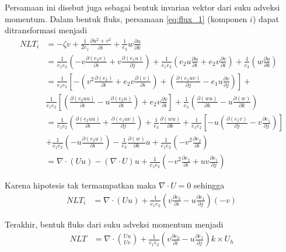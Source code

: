 \begin{spacing}{1.5}
	Persamaan ini disebut juga sebagai bentuk invarian vektor dari suku adveksi momentum. Dalam bentuk fluks, persamaan \ref{eq:flux_1} (komponen $i$) dapat ditransformasi menjadi
	\begin{equation*}
		\begin{aligned}
			NLT_i &= -\zeta v + \frac{1}{2e_1} \frac{\partial u^2+v^2}{\partial i} + \frac{1}{e_3}w\frac{\partial u}{\partial k} \\
			&= \frac{1}{e_1 e_2}\left(-v\frac{\partial (e_2 v)}{\partial i} + v\frac{\partial (e_1 u)}{\partial j}\right) + \frac{1}{e_1 e_2}\left(e_2 u\frac{\partial u}{\partial i} + e_2 v\frac{\partial v}{\partial i}\right) + \frac{1}{e_3}\left( w\frac{\partial u}{\partial k}\right)  
			\\
			&= \frac{1}{e_1 e_2} \left[-\left(v^2\frac{\partial (e_2)}{\partial i} + e_2v\frac{\partial (v)}{\partial i}\right) + \left(\frac{\partial (e_1uv)}{\partial j} - e_1u\frac{\partial v}{\partial j}\right)\right] +  
			\\
			& \frac{1}{e_1 e_2} \left[\left(\frac{\partial (e_2uu)}{\partial i} - u\frac{\partial (e_2u)}{\partial i}\right) + e_2v\frac{\partial v}{\partial i} \right] + \frac{1}{e_3}\left(\frac{\partial (wu)}{\partial k} - u\frac{\partial (w)}{\partial k}\right) 
			\\
			&= \frac{1}{e_1e_2}\left(\frac{\partial (e_2uu)}{\partial i} + \frac{\partial (e_1uv)}{\partial j}\right)+
			\frac{1}{e_3}\frac{\partial (wu)}{\partial k}+\frac{1}{e_1e_2}\left[-u\left(\frac{\partial (e_1v)}{\partial j}-v\frac{\partial e_1}{\partial j}\right)\right] 
			\\ 
			& + \frac{1}{e_1e_2}\left(-u\frac{\partial (e_2u)}{\partial i}\right) - \frac{1}{e_3}\frac{\partial (w)}{\partial k}u + \frac{1}{e_1e_2}\left(-v^2\frac{\partial e_2}{\partial i}\right)  	
			\\
			&= \nabla \cdot (Uu)-(\nabla \cdot U)u + \frac{1}{e_1e_2}\left(-v^2\frac{\partial e_2}{\partial i}+uv\frac{\partial e_1}{\partial j}\right)  
		\end{aligned}
	\end{equation*}
	
	Karena hipotesis tak termampatkan maka $\nabla \cdot U = 0$ sehingga
	\begin{equation}
		\begin{aligned}
			NLT_i &= \nabla \cdot (Uu) +  \frac{1}{e_1e_2}\left(v\frac{\partial e_2}{\partial i}-u\frac{\partial e_1}{\partial j}\right)(-v)
		\end{aligned}
	\end{equation}
	
	Terakhir, bentuk fluks dari suku adveksi momentum menjadi
	\begin{equation}
		\begin{aligned}
			NLT &= \nabla \cdot \binom{Uu}{Uv} +  \frac{1}{e_1e_2}\left(v\frac{\partial e_2}{\partial i}-u\frac{\partial e_1}{\partial j}\right)k \times U_h
		\end{aligned}
	\end{equation}
\end{spacing}
\vspace{-0.1pc}
